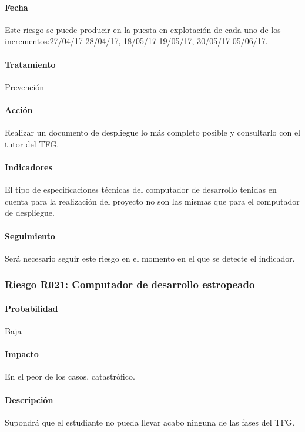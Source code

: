 \documentclass[10pt,a4paper]{article}
\begin{document}
				\paragraph{Fecha} Este riesgo se puede producir en la puesta en explotación de cada uno de los incrementos:27/04/17-28/04/17, 18/05/17-19/05/17, 30/05/17-05/06/17. %
				\paragraph{Tratamiento} Prevención %
				\paragraph{Acción} Realizar un documento de despliegue lo más completo posible y consultarlo con el tutor del TFG. %
				\paragraph{Indicadores} El tipo de  especificaciones técnicas del computador de desarrollo tenidas en cuenta para la realización del proyecto no son las mismas que para el computador de despliegue.  %
				\paragraph{Seguimiento}	Será necesario seguir este riesgo en el momento en el que se detecte el indicador.%
				
			\subsubsection{Riesgo R021: Computador de desarrollo estropeado }
				\paragraph{Probabilidad} Baja
				\paragraph{Impacto}	En el peor de los casos, catastrófico.
				\paragraph{Descripción} Supondrá que el estudiante no pueda llevar acabo ninguna de las fases del TFG.
\end{document}

